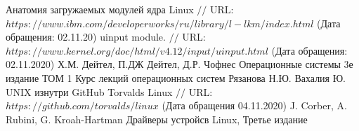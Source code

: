 \makeatletter \renewcommand{} \makeatother
\renewcommand\refname{Список использованных источников}
\begin{thebibliography}{00}
	
	Анатомия загружаемых модулей ядра Linux $//$ URL: $https://www.ibm.com/developerworks/ru/library/l-lkm/index.html$ (Дата обращения: 02.11.20)
	uinput module. $//$ URL: $https://www.kernel.org/doc/html/v4.12/input/uinput.html$ (Дата обращения: 02.11.2020)
	Х.М. Дейтел, П.ДЖ Дейтел, Д.Р. Чофнес Операционные системы 3е издание ТОМ 1
	Курс лекций операционных систем Рязанова Н.Ю.
	Вахалия Ю. UNIX изнутри 
	GitHub Torvalds Linux $//$ URL: $https://github.com/torvalds/linux$ (Дата обращения 04.11.2020)
	J. Corber, A. Rubini, G. Kroah-Hartman Драйверы устройсв Linux, Третье издание

\end{thebibliography}
